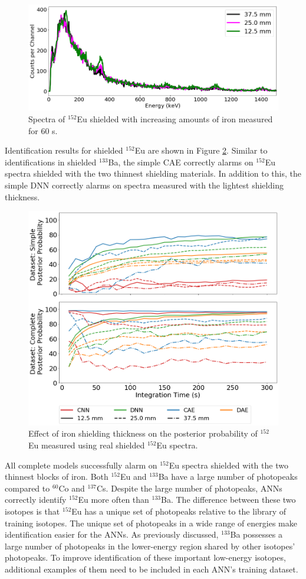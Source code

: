 \begin{figure}[H]
	\centering
	\includegraphics[width=0.8\linewidth]{images/shielded_eu152}
	\caption{Spectra of $^{152}$Eu shielded with increasing amounts of iron measured for 60 s.}
	\label{fig:shielded_eu152}
\end{figure}

Identification results for shielded $^{152}$Eu are shown in Figure \ref{fig:iron_eu152}. Similar to identifications in shielded $^{133}$Ba, the simple CAE correctly alarms on $^{152}$Eu spectra shielded with the two thinnest shielding materials. In addition to this, the simple DNN correctly alarms on spectra measured with the lightest shielding thickness.

\begin{figure}[H]
	\centering
	\includegraphics[width=0.8\linewidth]{images/iron_eu152}
	\caption{Effect of iron shielding thickness on the posterior probability of $^{152}$Eu measured using real shielded $^{152}$Eu spectra.}
	\label{fig:iron_eu152}
\end{figure}

All complete models successfully alarm on $^{152}$Eu spectra shielded with the two thinnest blocks of iron. Both $^{152}$Eu and $^{133}$Ba have a large number of photopeaks compared to $^{60}$Co and $^{137}$Cs. Despite the large number of photopeaks, ANNs correctly identify $^{152}$Eu more often than $^{133}$Ba. The difference between these two isotopes is that $^{152}$Eu has a unique set of photopeaks relative to the library of training isotopes. The unique set of photopeaks in a wide range of energies make identification easier for the ANNs. As previously discussed, $^{133}$Ba possesses a large number of photopeaks in the lower-energy region shared by other isotopes' photopeaks. To improve identification of these important low-energy isotopes, additional examples of them need to be included in each ANN's training dataset.

